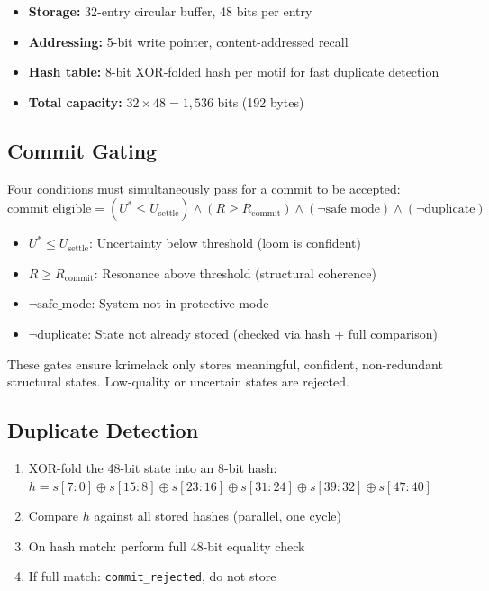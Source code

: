 \documentclass[11pt,a4paper]{article}
\begin{document}
\begin{itemize}
    \item \textbf{Storage:} 32-entry circular buffer, 48 bits per entry
    \item \textbf{Addressing:} 5-bit write pointer, content-addressed recall
    \item \textbf{Hash table:} 8-bit XOR-folded hash per motif for fast duplicate detection
    \item \textbf{Total capacity:} $32 \times 48 = 1,536$ bits (192 bytes)
\end{itemize}

\subsection{Commit Gating}

Four conditions must simultaneously pass for a commit to be accepted:
\begin{equation}
\text{commit\_eligible} = (U^* \leq U_{\text{settle}}) \wedge (R \geq R_{\text{commit}}) \wedge (\neg\text{safe\_mode}) \wedge (\neg\text{duplicate})
\end{equation}

\begin{itemize}
    \item $U^* \leq U_{\text{settle}}$: Uncertainty below threshold (loom is confident)
    \item $R \geq R_{\text{commit}}$: Resonance above threshold (structural coherence)
    \item $\neg\text{safe\_mode}$: System not in protective mode
    \item $\neg\text{duplicate}$: State not already stored (checked via hash + full comparison)
\end{itemize}

These gates ensure krimelack only stores meaningful, confident, non-redundant structural states. Low-quality or uncertain states are rejected.

\subsection{Duplicate Detection}

\begin{enumerate}
    \item XOR-fold the 48-bit state into an 8-bit hash: $h = s[7:0] \oplus s[15:8] \oplus s[23:16] \oplus s[31:24] \oplus s[39:32] \oplus s[47:40]$
    \item Compare $h$ against all stored hashes (parallel, one cycle)
    \item On hash match: perform full 48-bit equality check
    \item If full match: \texttt{commit\_rejected}, do not store
\end{enumerate}
\end{document}
